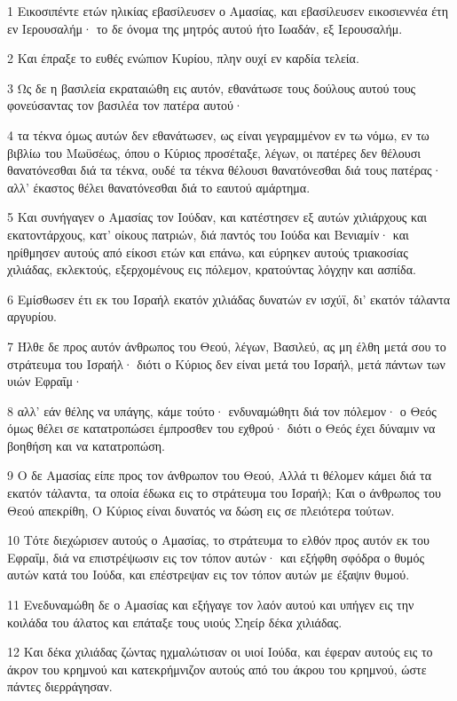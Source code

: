 \par 1 Εικοσιπέντε ετών ηλικίας εβασίλευσεν ο Αμασίας, και εβασίλευσεν εικοσιεννέα έτη εν Ιερουσαλήμ· το δε όνομα της μητρός αυτού ήτο Ιωαδάν, εξ Ιερουσαλήμ.
\par 2 Και έπραξε το ευθές ενώπιον Κυρίου, πλην ουχί εν καρδία τελεία.
\par 3 Ως δε η βασιλεία εκραταιώθη εις αυτόν, εθανάτωσε τους δούλους αυτού τους φονεύσαντας τον βασιλέα τον πατέρα αυτού·
\par 4 τα τέκνα όμως αυτών δεν εθανάτωσεν, ως είναι γεγραμμένον εν τω νόμω, εν τω βιβλίω του Μωϋσέως, όπου ο Κύριος προσέταξε, λέγων, οι πατέρες δεν θέλουσι θανατόνεσθαι διά τα τέκνα, ουδέ τα τέκνα θέλουσι θανατόνεσθαι διά τους πατέρας· αλλ' έκαστος θέλει θανατόνεσθαι διά το εαυτού αμάρτημα.
\par 5 Και συνήγαγεν ο Αμασίας τον Ιούδαν, και κατέστησεν εξ αυτών χιλιάρχους και εκατοντάρχους, κατ' οίκους πατριών, διά παντός του Ιούδα και Βενιαμίν· και ηρίθμησεν αυτούς από είκοσι ετών και επάνω, και εύρηκεν αυτούς τριακοσίας χιλιάδας, εκλεκτούς, εξερχομένους εις πόλεμον, κρατούντας λόγχην και ασπίδα.
\par 6 Εμίσθωσεν έτι εκ του Ισραήλ εκατόν χιλιάδας δυνατών εν ισχύϊ, δι' εκατόν τάλαντα αργυρίου.
\par 7 Ήλθε δε προς αυτόν άνθρωπος του Θεού, λέγων, Βασιλεύ, ας μη έλθη μετά σου το στράτευμα του Ισραήλ· διότι ο Κύριος δεν είναι μετά του Ισραήλ, μετά πάντων των υιών Εφραΐμ·
\par 8 αλλ' εάν θέλης να υπάγης, κάμε τούτο· ενδυναμώθητι διά τον πόλεμον· ο Θεός όμως θέλει σε κατατροπώσει έμπροσθεν του εχθρού· διότι ο Θεός έχει δύναμιν να βοηθήση και να κατατροπώση.
\par 9 Ο δε Αμασίας είπε προς τον άνθρωπον του Θεού, Αλλά τι θέλομεν κάμει διά τα εκατόν τάλαντα, τα οποία έδωκα εις το στράτευμα του Ισραήλ; Και ο άνθρωπος του Θεού απεκρίθη, Ο Κύριος είναι δυνατός να δώση εις σε πλειότερα τούτων.
\par 10 Τότε διεχώρισεν αυτούς ο Αμασίας, το στράτευμα το ελθόν προς αυτόν εκ του Εφραΐμ, διά να επιστρέψωσιν εις τον τόπον αυτών· και εξήφθη σφόδρα ο θυμός αυτών κατά του Ιούδα, και επέστρεψαν εις τον τόπον αυτών με έξαψιν θυμού.
\par 11 Ενεδυναμώθη δε ο Αμασίας και εξήγαγε τον λαόν αυτού και υπήγεν εις την κοιλάδα του άλατος και επάταξε τους υιούς Σηείρ δέκα χιλιάδας.
\par 12 Και δέκα χιλιάδας ζώντας ηχμαλώτισαν οι υιοί Ιούδα, και έφεραν αυτούς εις το άκρον του κρημνού και κατεκρήμνιζον αυτούς από του άκρου του κρημνού, ώστε πάντες διερράγησαν.
